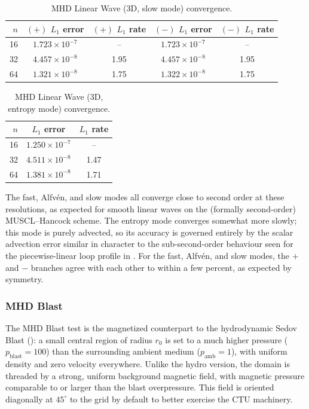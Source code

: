 \documentclass[11pt]{report}
\begin{document}
\begin{table}[htbp]
\centering
\caption{MHD Linear Wave (3D, slow mode) convergence.}
\begin{tabular}{rcccc}
\toprule
$n$ & $(+)$ $L_1$ error & $(+)$ $L_1$ rate & $(-)$ $L_1$ error & $(-)$ $L_1$ rate \\
\midrule
16 & $1.723\times10^{-7}$ & --   & $1.723\times10^{-7}$ & --   \\
32 & $4.457\times10^{-8}$ & 1.95 & $4.457\times10^{-8}$ & 1.95 \\
64 & $1.321\times10^{-8}$ & 1.75 & $1.322\times10^{-8}$ & 1.75 \\
\bottomrule
\end{tabular}
\label{tab:wave-slow}
\end{table}

\begin{table}[!htbp]
\centering
\caption{MHD Linear Wave (3D, entropy mode) convergence.}
\begin{tabular}{rcc}
\toprule
$n$ & $L_1$ error & $L_1$ rate \\
\midrule
16 & $1.250\times10^{-7}$ & --   \\
32 & $4.511\times10^{-8}$ & 1.47 \\
64 & $1.381\times10^{-8}$ & 1.71 \\
\bottomrule
\end{tabular}
\label{tab:wave-entropy}
\end{table}

The fast, Alfv\'en, and slow modes all converge close to second order at these resolutions, as expected for smooth linear waves on the (formally second-order) MUSCL--Hancock scheme.
The entropy mode converges somewhat more slowly; this mode is purely advected, so its accuracy is governed entirely by the scalar advection error similar in character to the sub-second-order behaviour seen for the piecewise-linear loop profile in .
For the fast, Alfv\'en, and slow modes, the  $+$ and $-$ branches agree with each other to within a few percent, as expected by symmetry.



\subsubsection{MHD Blast}
\label{sec:mhd-blast}

The MHD Blast test \citep{GardinerStone2008} is the magnetized counterpart to the hydrodynamic Sedov Blast (): a small central region of radius $r_0$ is set to a much higher pressure ($p_\mathrm{blast}=100$) than the surrounding ambient medium ($p_\mathrm{amb}=1$), with uniform density and zero velocity everywhere. 
Unlike the hydro version, the domain is threaded by a strong, uniform background magnetic field, with magnetic pressure comparable to or larger than the blast overpressure. 
This field is  oriented diagonally at $45^\circ$ to the grid by default to better exercise the CTU machinery.
\end{document}
